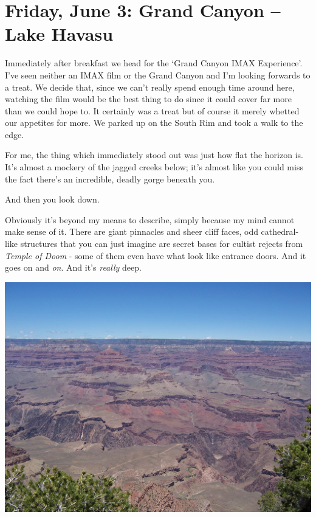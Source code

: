 \documentclass[a5paper,titlepage,11pt,draft]{book}
\begin{document}
\chapter[Grand Canyon -- Lake Havasu]{Friday, June 3: Grand Canyon -- Lake Havasu}
Immediately after breakfast we head for the `Grand Canyon IMAX Experience'.  I've seen neither an IMAX film or the Grand Canyon and I'm looking forwards to a treat.  We decide that, since we can't really spend enough time around here, watching the film would be the best thing to do since it could cover far more than we could hope to. It certainly was a treat but of course it merely whetted our appetites for more.  We parked up on the South Rim and took a walk to the edge.

For me, the thing which immediately stood out was just how flat the horizon is.  It's almost a mockery of the jagged creeks below; it's almost like you could miss the fact there's an incredible, deadly gorge beneath you.

And then you look down.

Obviously it's beyond my means to describe, simply because my mind cannot make sense of it.  There are giant pinnacles and sheer cliff faces, odd cathedral-like structures that you can just imagine are secret bases for cultist rejects from \emph{Temple of Doom} - some of them even have what look like entrance doors.  And it goes on and \emph{on}.  And it's \emph{really} deep.

\begin{center}\includegraphics[width=\textwidth]{gfx/100_1458}\end{center}
\end{document}
